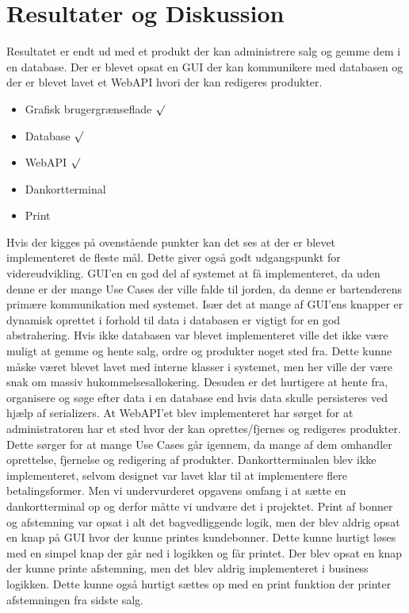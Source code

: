 \section{Resultater og Diskussion}
Resultatet er endt ud med et produkt der kan administrere salg og gemme dem i en database. Der er blevet opsat en \gls{GUI} der kan kommunikere med databasen og der er blevet lavet et \gls{WebAPI} hvori der kan redigeres produkter. 

\begin{itemize}
	\item Grafisk brugergrænseflade $\surd$
	\item Database $\surd$
	\item \gls{WebAPI} $\surd$
	\item Dankortterminal
	\item Print
\end{itemize}  

Hvis der kigges på ovenstående punkter kan det ses at der er blevet implementeret de fleste mål. Dette giver også godt udgangspunkt for videreudvikling. 
\gls{GUI}'en en god del af systemet at få implementeret, da uden denne er der mange Use Cases der ville falde til jorden, da denne er bartenderens primære kommunikation med systemet. Især det at mange af \gls{GUI}'ens knapper er dynamisk oprettet i forhold til data i databasen er vigtigt for en god abstrahering.\newline 
Hvis ikke databasen var blevet implementeret ville det ikke være muligt at gemme og hente salg, ordre og produkter noget sted fra. Dette kunne måske været blevet lavet med interne klasser i systemet, men her ville der være snak om massiv hukommelsesallokering. Desuden er det hurtigere at hente fra, organisere og søge efter data i en database end hvis data skulle persisteres ved hjælp af serializers.  
\newline
\newline
At \gls{WebAPI}'et blev implementeret har sørget for at administratoren har et sted hvor der kan oprettes/fjernes og redigeres produkter. Dette sørger for at mange Use Cases går igennem, da mange af dem omhandler oprettelse, fjernelse og redigering af produkter.  
\newline
\newline
Dankortterminalen blev ikke implementeret, selvom designet var lavet klar til at implementere flere betalingsformer. Men vi undervurderet opgavens omfang i at sætte en dankortterminal op og derfor måtte vi undvære det i projektet. 
\newline
\newline
Print af bonner og afstemning var opsat i alt det bagvedliggende logik, men der blev aldrig opsat en knap på \gls{GUI} hvor der kunne printes kundebonner. Dette kunne hurtigt løses med en simpel knap der går ned i logikken og får printet. Der blev opsat en knap der kunne printe afstemning, men det blev aldrig implementeret i business logikken. Dette kunne også hurtigt sættes op med en print funktion der printer afstemningen fra sidste salg.  
 